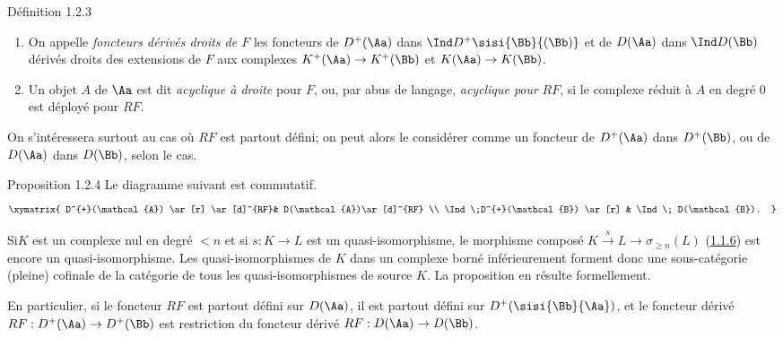 \documentclass[10pt]{../fichiers-configuration-latex/smfart}
\begin{document}
\begin{enonce*}{Définition 1.2.3}
\begin{enumerate}
\renewcommand{\theenumi}{\roman{enumi}}
\renewcommand{\labelenumi}{(\theenumi)}
\item On appelle \emph{foncteurs dérivés droits de $F$} les foncteurs
de $D^{+}(\Aa)$ dans $\Ind D^{+}\sisi{\Bb}{(\Bb)}$ et de
$D(\Aa)$ dans $\Ind D(\Bb)$ dérivés droits des
extensions de $F$ aux complexes $K^{+}(\Aa)\rightarrow
K^{+}(\Bb)$ et $K(\Aa)\rightarrow K(\Bb)$.

\item Un objet $A$ de $\Aa$ est dit \emph{acyclique à droite}
pour $F$, ou, par abus de langage, \emph{acyclique pour} $RF$, si le
complexe réduit à $A$ en degré $0$ est déployé pour $RF$.
\end{enumerate}
\end{enonce*}

On s'intéressera surtout au cas où $RF$ est partout défini; on peut
alors le considérer comme un foncteur de $D^{+}(\Aa)$ dans
$D^{+}(\Bb)$, ou de $D(\Aa)$ dans $D(\Bb)$, selon le cas.

\begin{enonce*}{Proposition 1.2.4}
Le diagramme suivant est commutatif.
\[
\xymatrix{
D^{+}(\mathcal{A})  \ar[r] \ar[d]^{RF}& D(\mathcal{A})\ar[d]^{RF}        \\
 \Ind \;D^{+}(\mathcal{B}) \ar[r] & \Ind \; D(\mathcal{B}).
}
\]
\end{enonce*}

Si\pageoriginale $K$ est un complexe nul en degré $<n$ et si
$s:K\rightarrow L$ est un quasi-isomorphisme, le morphisme composé
$K\xrightarrow{s}L\rightarrow \sigma_{\geq n}(L)$
(\hyperref[XVII.subsubsec1.1.6]{1.1.6}) est encore un quasi-isomorphisme. Les
quasi-isomorphismes de $K$ dans un complexe borné inférieurement
forment donc une sous-catégorie (pleine) cofinale de la catégorie de
tous les quasi-isomorphismes de source $K$. La proposition en résulte
formellement.

En particulier, si le foncteur $RF$\sisi{,}{} est partout défini sur
$D(\Aa)$, il est partout défini sur $D^{+}(\sisi{\Bb}{\Aa})$, et
le foncteur dérivé $RF:D^{+}(\Aa)\rightarrow
D^{+}(\Bb)$ est restriction du foncteur dérivé
$RF:D(\Aa)\rightarrow D(\Bb)$.

\setcounter{subsubsection}{4}
\end{document}
